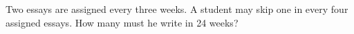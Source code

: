 Two essays are assigned every three weeks. A student may skip one in every four assigned essays. How many must he write in 24 weeks?
